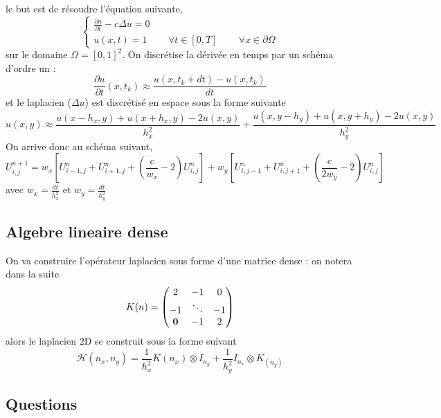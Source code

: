 \documentclass[11pt,a4wide]{article}
\begin{document}
\begin{itemize}
   le but est de résoudre l'équation suivante, 
$$
\begin{cases} 
\frac{\partial u}{\partial t} - c \Delta u = 0 \\
u(x,t) = 1 \, \qquad \forall  t \in [0,T] \qquad \,  \forall x \in \partial \Omega
\end{cases}
$$
sur le domaine $\Omega = [0,1]^2$.
On discrétise la dérivée en temps par un schéma d'ordre un :
$$
\frac{\partial u}{\partial t}(x,t_k) \approx \frac{u(x, t_k + dt) - u(x, t_k)}{dt}
$$
et le laplacien ($\Delta u$) est discrétisé en espace sous la forme suivante 
$$
u(x,y) \approx \frac{u(x-h_x, y) + u(x+ h_x, y) - 2 u(x,y)}{h_x^2} +  \frac{u(x, y-h_y) + u(x, y + h_y) - 2 u(x,y)}{h_y^2} 
$$
On arrive donc au schéma suivant, 
\begin{equation}\label{Chal}
U^{n+1}_{i,j} =  w_x \left[U^n_{i-1, j} + U^n_{i+1, j} + \left(\frac{c}{w_x}-2\right) U^n_{i,j} \right] 
             + w_y \left[U^n_{i,j-1} + U^n_{i, j+1} + \left(\frac{c}{2w_y}-2\right)U^n_{i,j} \right]
\end{equation}
avec $w_x = \frac{dt}{h_x^2}$ et $w_y = \frac{dt}{h_y^2}$

 \end{itemize}
 
   \subsection{Algebre lineaire dense}

    On va construire l'opérateur laplacien sous forme d'une matrice dense : on notera dans la suite
$$
K(n) = \begin{pmatrix}
       2       & -1      & 0 \\
       -1      &  \ddots & -1 \\
       {\bf 0} & -1      & 2 \\
       \end{pmatrix}
$$
alors le laplacien 2D se construit sous la forme suivant
$$
{\mathcal H}(n_x,n_y) = \frac{1}{h_x^2} K(n_x) \otimes I_{n_y} + \frac{1}{h_y^2} I_{n_x} \otimes  K_(n_y) 
$$

   \subsection{Questions}
     
\end{document}
